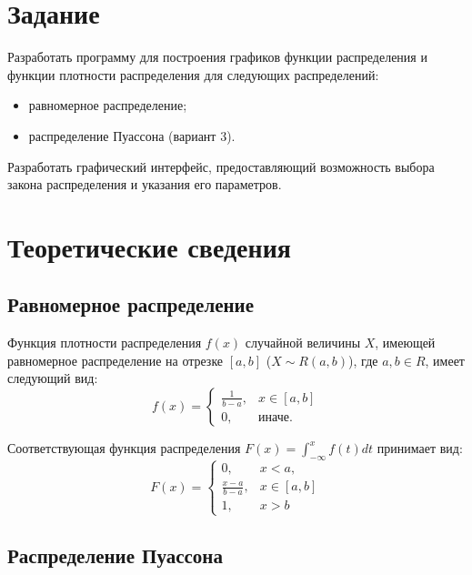 \documentclass[14pt, a4paper]{extarticle}
\begin{document}


\setcounter{page}{2}

\section{Задание}
Разработать программу для построения графиков функции распределения и функции плотности распределения для следующих распределений: 
\begin{itemize}
	\item равномерное распределение;
	\item распределение Пуассона (вариант 3).
\end{itemize} 

Разработать графический интерфейс, предоставляющий возможность выбора закона распределения и указания его параметров.

\section{Теоретические сведения}

\subsection{Равномерное распределение}

Функция плотности распределения $f(x)$ случайной величины $X$, имеющей равномерное распределение на отрезке $[a, b]$ ($X \sim R(a, b)$), где $a, b \in R$, имеет следующий вид:
\begin{equation}
	f(x)=\begin{cases}
		\frac{1}{b - a}, & x \in [a, b] \\
		0, & \text{иначе}.
	\end{cases}
\end{equation}

Соответствующая функция распределения $F(x) = \int_{-\infty}^{x}f(t)dt$ принимает вид: 
\begin{equation}
	F(x)=\begin{cases}
		0, & x < a, \\
		\frac{x - a}{b - a}, & x \in [a, b] \\
		1, & x > b
	\end{cases}
\end{equation}


\subsection{Распределение Пуассона}
\end{document}
